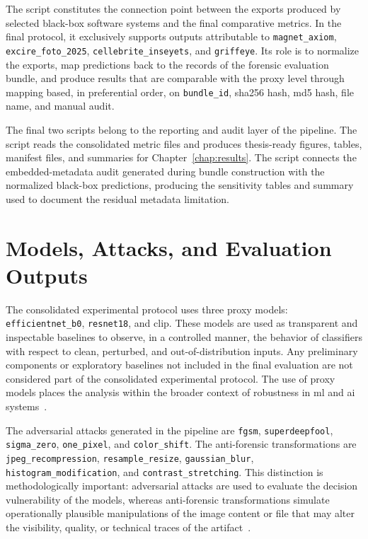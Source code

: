 The script
constitutes the connection point between the exports produced by selected
black-box software systems and the final comparative metrics. In the final
protocol, it exclusively supports outputs attributable to
\texttt{magnet\_axiom}, \texttt{excire\_foto\_2025},
\texttt{cellebrite\_inseyets}, and \texttt{griffeye}. Its role is to normalize
the exports, map predictions back to the records of the forensic evaluation
bundle, and produce results that are comparable with the proxy level through
mapping based, in preferential order, on \texttt{bundle\_id}, \gls{sha256}
hash, \gls{md5} hash, file name, and manual audit.

The final two scripts belong to the reporting and audit layer of the pipeline.
The script
 reads
the consolidated metric files and produces thesis-ready figures, tables,
manifest files, and summaries for Chapter~\ref{chap:results}. The script
connects the embedded-metadata audit generated during bundle construction with
the normalized black-box predictions, producing the sensitivity tables and
summary used to document the residual metadata limitation.


\section{Models, Attacks, and Evaluation Outputs}
\label{app:models-attacks-evaluation-outputs}

The consolidated experimental protocol uses three proxy models:
\texttt{efficientnet\_b0}, \texttt{resnet18}, and \gls{clip}. These models are
used as transparent and inspectable baselines to observe, in a controlled
manner, the behavior of classifiers with respect to clean, perturbed, and
out-of-distribution inputs. Any preliminary components or exploratory baselines
not included in the final evaluation are not considered part of the consolidated
experimental protocol. The use of proxy models places the analysis within the
broader context of robustness in \gls{ml} and \gls{ai}
systems~\cite{bishop2006pattern,biggio2018wild,radford2021learning}.

The adversarial attacks generated in the pipeline are \texttt{fgsm},
\texttt{superdeepfool}, \texttt{sigma\_zero}, \texttt{one\_pixel}, and
\texttt{color\_shift}. The anti-forensic transformations are
\texttt{jpeg\_recompression}, \texttt{resample\_resize},
\texttt{gaussian\_blur}, \texttt{histogram\_modification}, and
\texttt{contrast\_stretching}. This distinction is methodologically important:
adversarial attacks are used to evaluate the decision vulnerability of the
models, whereas anti-forensic transformations simulate operationally plausible
manipulations of the image content or file that may alter the visibility,
quality, or technical traces of the artifact~\cite{stamm2010anti,nowroozi2021survey,croce2020robustbench}.

